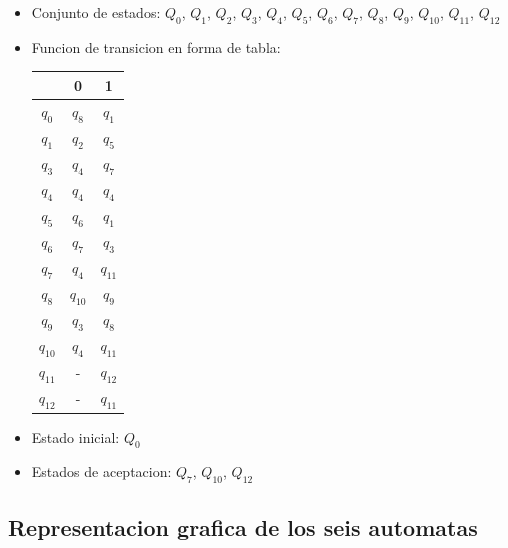 \documentclass[a4paper, 12pt]{article}
\begin{document}
\begin{itemize}
    \item Conjunto de estados: \( Q_0 \),  \( Q_1 \), \( Q_2 \), \( Q_3 \), \( Q_4 \),  \( Q_5 \), \( Q_6 \), \( Q_7 \), \( Q_8 \),  \( Q_9 \), \( Q_{10} \), \( Q_{11} \), \( Q_{12} \)
    \item Funcion de transicion en forma de tabla:
    \newline

    \hspace{5cm}
    \begin{tabular}{|c|c|c|}
    \hline
     & 0 & 1 \\
    \hline
    \( q_0 \) & \( q_8 \) & \( q_1 \) \\
    
    \( q_1 \) & \( q_2 \) & \( q_5 \) \\

    \( q_3 \) & \( q_4 \) & \( q_7 \) \\

    \( q_4 \) & \( q_4 \) & \( q_4 \) \\

    \( q_5 \) & \( q_6 \) & \( q_1 \) \\

    \( q_6 \) & \( q_7 \) & \( q_3 \) \\

    \( q_7 \) & \( q_4 \) & \( q_{11} \) \\

    \( q_8 \) & \( q_{10} \) & \( q_9 \) \\

    \( q_9 \) & \( q_3 \) & \( q_8 \) \\

    \( q_{10} \) & \( q_4 \) & \( q_{11} \) \\

    \( q_{11} \) & - & \( q_{12} \) \\

    \( q_{12} \) & - & \( q_{11} \) \\
    \hline
    \end{tabular}

    \item Estado inicial: \( Q_0 \)
    \item Estados de aceptacion: \( Q_7 \), \( Q_{10} \), \( Q_{12} \)

\end{itemize}

\subsection{Representacion grafica de los seis automatas}
\end{document}
